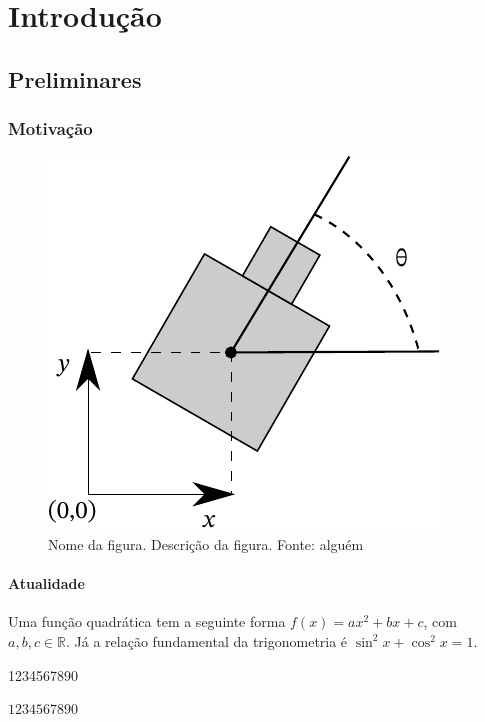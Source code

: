 \chapter{Introdução}

\blindtext[2]

\section{Preliminares}

\blindtext[2]

\subsection{Motivação}

\blindtext[1]

\begin{figure}[H]
    \centering
    \includegraphics{figures/uav_localization.pdf}
    \caption[Nome da figura]{Nome da figura. Descrição da figura. Fonte: alguém}
\end{figure}

\blindtext[1]

\subsubsection{Atualidade}

\blindmathpaper

Uma função quadrática tem a seguinte forma \(f(x) = ax^2+bx+c\), com \(a,b,c \in \mathbb{R}\). Já a relação fundamental da trigonometria é \(\sin^2x+\cos^2x = 1\).

1234567890

\(1234567890\)